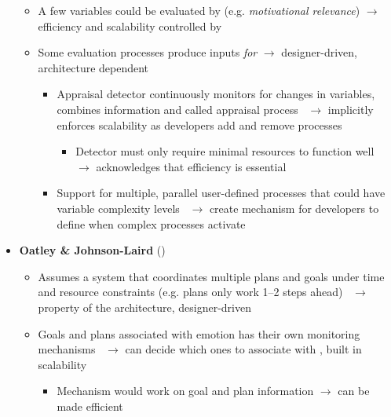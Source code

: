 \begin{itemize}
\begin{itemize}
        \item A few variables could be evaluated by \progname{} (e.g.
        \textit{motivational relevance}) $\rightarrow$ efficiency and
        scalability controlled by \progname{}

        \item Some evaluation processes produce inputs \textit{for} \progname{}
        $\rightarrow$ designer-driven, architecture dependent
        \begin{itemize}
            \item Appraisal detector continuously monitors for changes in
            variables, combines information and called appraisal
            process~\citep[p.~129--130]{smith2001toward} $\rightarrow$
            implicitly enforces scalability as developers add and remove
            processes
            \begin{itemize}
                \item Detector must only require minimal resources to function
                well~\citep[p.~90--91]{smith2000consequences} $\rightarrow$
                acknowledges that efficiency is essential
            \end{itemize}

            \item Support for multiple, parallel user-defined processes that
            could have variable complexity
            levels~\citep[p.~91--92]{smith2000consequences} $\rightarrow$
            create mechanism for developers to define when complex processes
            activate
        \end{itemize}
    \end{itemize}

    \item \textbf{Oatley \& Johnson-Laird} (\strong)
    \begin{itemize}
        \item Assumes a system that coordinates multiple plans and goals under
        time and resource constraints (e.g. plans only work 1--2 steps
        ahead)~\citep[p.~31, 36]{oatley1987towards} $\rightarrow$ property of
        the architecture, designer-driven

        \item Goals and plans associated with emotion has their own monitoring
        mechanisms~\citep[p.~50]{oatley1992best} $\rightarrow$ can decide which
        ones to associate with \progname{}, built in scalability
        \begin{itemize}
            \item Mechanism would work on goal and plan information
            $\rightarrow$ can be made efficient
        \end{itemize}


\end{itemize}
\end{itemize}
